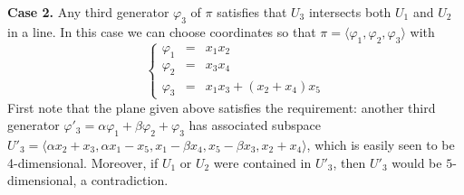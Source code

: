 \documentclass[10pt,reqno]{amsart}
\newcommand{\la}{\langle}
\newcommand{\ra}{\rangle}
\renewcommand{\a}{\alpha}
\renewcommand{\b}{\beta}
\newcommand{\f}{\varphi}
\theoremstyle{definition}
\begin{document}
\noindent \textbf{Case 2.} Any third generator $\f_3$ of $\pi$ satisfies that $U_3$ intersects both $U_1$ and $U_2$ in a line. In this case we can choose coordinates so that $\pi=\la \f_1,\f_2,\f_3\ra$ with
\[ 
\left\{\begin{array}{ccl}
 \f_1 & = & x_1x_2\\
 \f_2 & = & x_3x_4\\
 \f_3 & = & x_1x_3+(x_2+x_4)x_5
\end{array}\right.
\]
First note that the plane given above satisfies the requirement: another third generator $\f'_3=\a \f_1+\b \f_2+\f_3$ has associated subspace $U'_3=\la\a x_2+x_3,\a x_1-x_5,x_1-\b x_4,x_5-\b x_3,x_2+x_4\ra$, which is easily seen to be 4-dimensional. Moreover, if $U_1$ or $U_2$ were contained in $U'_3$, then $U'_3$ would be $5$-dimensional, a contradiction.
\end{document}
